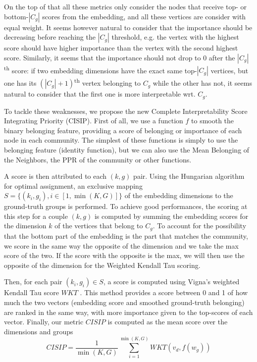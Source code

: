 On the top of that all these metrics only consider the nodes that receive top- or bottom-$|C_g|$ scores from the embedding, and all these vertices are consider with equal weight. It seems however natural to consider that the importance should be decreasing before reaching the $|C_g|$ threshold, e.g. the vertex with the highest score should have higher importance than the vertex with the second highest score. Similarly, it seems that the importance should not drop to 0 after the $|C_g|$\textsuperscript{th} score: if two embedding dimensions have the exact same top-$|C_g|$ vertices, but one has its $(|C_g|+1)$\textsuperscript{th} vertex belonging to $C_g$ while the other has not, it seems natural to consider that the first one is more interpretable wrt. $C_g$. 

To tackle these weaknesses, we propose the new Complete Interpretability Score Integrating Priority (CISIP). First of all, we use a function $f$ to smooth the binary belonging feature, providing a score of belonging or importance of each node in each community. The simplest of these functions is simply to use the belonging feature (identity function), but we can also use the Mean Belonging of the Neighbors, the PPR of the community
or other functions.

A score is then attributed to each $(k, g)$ pair. Using the Hungarian algorithm for optimal assignment, an exclusive mapping $S = \{(k_i, g_i), i \in [1, \min(K, G)]\}$ of the embedding dimensions to the ground-truth groups is performed. To achieve good performances, the scoring at this step for a couple $(k, g)$ is computed by summing the embedding scores for the dimension $k$ of the vertices that belong to $C_g$.
To account for the possibility that the bottom part of the embedding is the part that matches the community, we score in the same way the opposite of the dimension and we take the max score of the two. If the score with the opposite is the max, we will then use the opposite of the dimension for the Weighted Kendall Tau scoring.

Then, for each pair $(k_i, g_i) \in S$, a score is computed using Vigna's weighted Kendall Tau score $WKT$ \cite{vigna_2015}. This method provides a score between 0 and 1 of how much the two vectors (embedding score and smoothed ground-truth belonging) are ranked in the same way, with more importance given to the top-scores of each vector. Finally, our metric $CISIP$ is computed as the mean score over the dimensions and groups
\begin{equation}
    CISIP = \frac{1}{\min(K, G)}\sum_{i=1}^{\min(K, G)}WKT(v_d, f(w_g))
\end{equation}

